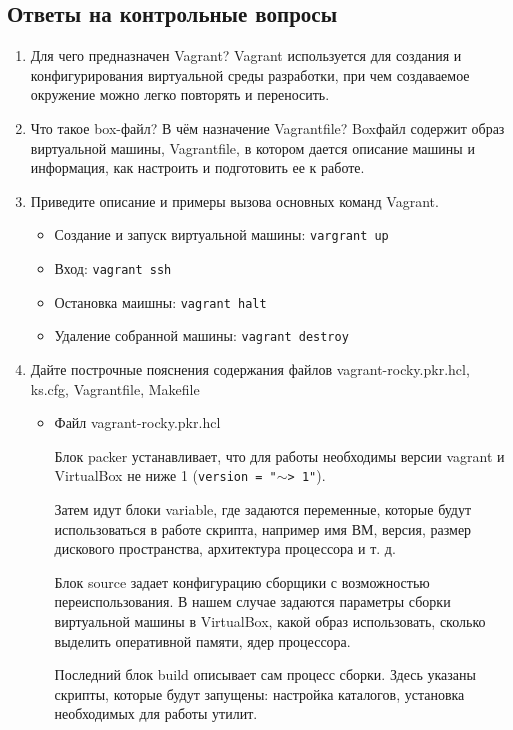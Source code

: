 \subsection{Ответы на контрольные вопросы}
\begin{enumerate}
    \item Для чего предназначен Vagrant?
        Vagrant используется для создания и конфигурирования виртуальной среды разработки, при чем создаваемое окружение можно легко повторять и переносить.
    \item Что такое box-файл? В чём назначение Vagrantfile?
        Box\-файл содержит образ виртуальной машины, Vagrantfile, в котором дается описание машины и информация, как настроить и подготовить ее к работе.
    \item Приведите описание и примеры вызова основных команд Vagrant.
        \begin{itemize}
            \item Создание и запуск виртуальной машины: \texttt{vargrant up}
            \item Вход: \texttt{vagrant ssh}
            \item Остановка маишны: \texttt{vagrant halt}
            \item Удаление собранной машины: \texttt{vagrant destroy}
        \end{itemize}
    \item Дайте построчные пояснения содержания файлов vagrant-rocky.pkr.hcl, ks.cfg, Vagrantfile, Makefile
        \begin{itemize}
            \item Файл vagrant-rocky.pkr.hcl

                Блок packer устанавливает, что для работы необходимы версии vagrant и VirtualBox не ниже 1 (\texttt{version = "$\sim$> 1"}).

                Затем идут блоки variable, где задаются переменные, которые будут использоваться в работе скрипта, например имя ВМ, версия, размер дискового пространства, архитектура процессора и т. д. 

                Блок source задает конфигурацию сборщики с возможностью переиспользования. В нашем случае задаются параметры сборки виртуальной машины в VirtualBox, какой образ использовать, сколько выделить оперативной памяти, ядер процессора.

                Последний блок build описывает сам процесс сборки. Здесь указаны скрипты, которые будут запущены: настройка каталогов, установка необходимых для работы утилит.


\end{itemize}
\end{enumerate}
